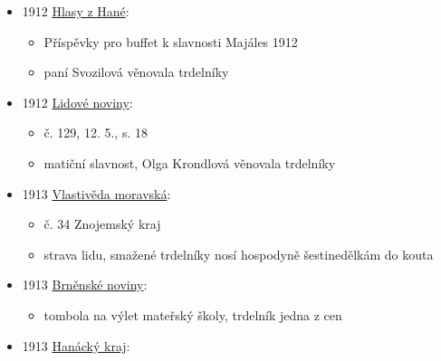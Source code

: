 \begin{itemize}
  \begin{itemize}
  \tightlist
  \item
    Poštorná a venkov na matiční slavnosti v Břeclavi
  \item
    dámské výbory připravují bufety, například pečivo slovácké,
    trdelníky, břeclavské koláče
  \end{itemize}
\item
  1912
  \href{https://www.digitalniknihovna.cz/vkol/uuid/uuid:83d7034e-4562-4959-9d71-871d7f2d01c9}{Hlasy
  z Hané}:

  \begin{itemize}
  \tightlist
  \item
    Příspěvky pro buffet k slavnosti Majáles 1912
  \item
    paní Svozilová věnovala trdelníky
  \end{itemize}
\item
  1912
  \href{https://www.digitalniknihovna.cz/vkol/uuid/uuid:bfcd38ce-435d-11dd-b505-00145e5790ea}{Lidové
  noviny}:

  \begin{itemize}
  \tightlist
  \item
    č. 129, 12. 5., s. 18
  \item
    matiční slavnost, Olga Krondlová věnovala trdelníky
  \end{itemize}
\item
  1913
  \href{https://ceskadigitalniknihovna.cz/view/uuid:3bc6373e-804a-44b4-b42f-50d5bf37e90d?page=uuid\%3Af7d19e61-5740-11e3-852c-0050569d679d&fulltext=trdelniky&source=mzk}{Vlastivěda
  moravská}:

  \begin{itemize}
  \tightlist
  \item
    č. 34 Znojemský kraj
  \item
    strava lidu, smažené trdelníky nosí hospodyně šestinedělkám do kouta
  \end{itemize}
\item
  1913
  \href{https://ceskadigitalniknihovna.cz/view/uuid:01729a50-78ad-11e3-a388-5ef3fc9ae867?page=uuid\%3A3eefbb60-79ca-11e3-b0d1-005056827e51&fulltext=trdeln\%C3\%ADk\%20OR\%20trdeln\%C3\%ADky\%20OR\%20trdeln\%C3\%ADk\%C5\%AF&source=mzk}{Brněnské
  noviny}:

  \begin{itemize}
  \tightlist
  \item
    tombola na výlet mateřský školy, trdelník jedna z cen
  \end{itemize}
\item
  1913
  \href{https://www.digitalniknihovna.cz/vkol/uuid/uuid:2997b9af-6b24-4bda-b3cb-6dc7e7e97004}{Hanácký
  kraj}:


\end{itemize}
